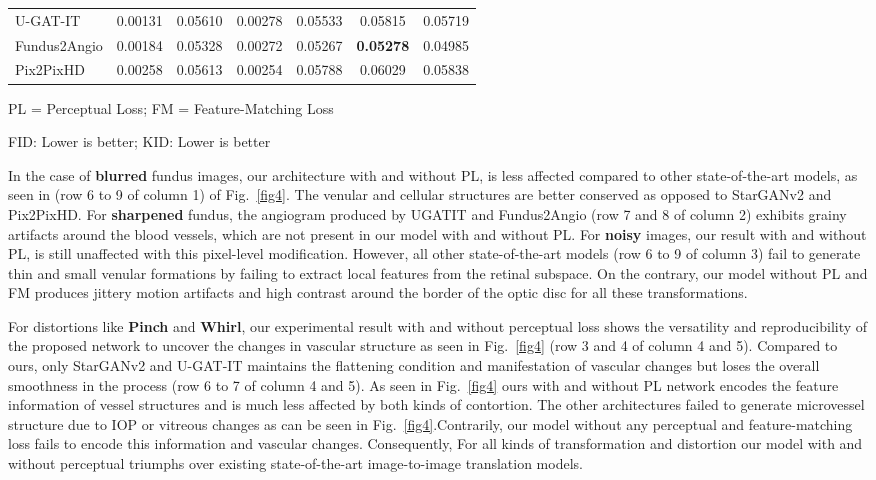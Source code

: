 \documentclass[a4paper,conference]{IEEEtran}
\begin{document}
\begin{table*}[ht]
\begin{adjustbox}{width=5.8in,totalheight=2.8in}
\begin{threeparttable}
\begin{tabular}{|l|c|c|c|c|c|c|}
    U-GAT-IT \cite{kim2019u} & 0.00131	& 0.05610 & 0.00278 & 0.05533 & 0.05815 & 0.05719\\
    Fundus2Angio \cite{kamran2020fundus2angio} & 0.00184 & 0.05328 & 0.00272 & 0.05267 & \textbf{0.05278} & 0.04985 \\ 
    Pix2PixHD \cite{wang2018high} & 0.00258 & 0.05613 & 0.00254 & 0.05788 & 0.06029 & 0.05838 \\ 
    \hline
    \end{tabular}
    \begin{tablenotes}
         \item[1] PL = Perceptual Loss; FM = Feature-Matching Loss
         \item[2] FID: Lower is better; KID: Lower is better
    \end{tablenotes}
\end{threeparttable}
\end{adjustbox}
\label{table1}
\end{table*}

In the case of \textbf{blurred} fundus images, our architecture with and without PL, is less affected compared to other state-of-the-art models, as seen in (row 6 to 9 of column 1) of Fig.~\ref{fig4}. The venular and cellular structures are better conserved as opposed to StarGANv2 and Pix2PixHD. For \textbf{sharpened} fundus, the angiogram produced by UGATIT and Fundus2Angio (row 7 and 8 of column 2) exhibits grainy artifacts around the blood vessels, which are not present in our model with and without PL. For \textbf{noisy} images, our result with and without PL, is still unaffected with this pixel-level modification. However, all other state-of-the-art models (row 6 to 9 of column 3) fail to generate thin and small venular formations by failing to extract local features from the retinal subspace. On the contrary, our model without PL and FM produces jittery motion artifacts and high contrast around the border of the optic disc for all these transformations.


For distortions like \textbf{Pinch} and \textbf{Whirl}, our experimental result with and without perceptual loss shows the versatility and reproducibility of the proposed network to uncover the changes in vascular structure as seen in Fig.~\ref{fig4} (row 3 and 4 of column 4 and 5). Compared to ours, only StarGANv2 and U-GAT-IT maintains the flattening condition and manifestation of vascular changes but loses the overall smoothness in the process (row 6 to 7 of column 4 and 5). As seen in Fig.~\ref{fig4} ours with and without PL network encodes the feature information of vessel structures and is much less affected by both kinds of contortion. The other architectures failed to generate microvessel structure due to IOP or vitreous changes as can be seen in Fig.~\ref{fig4}.Contrarily, our model without any perceptual and feature-matching loss fails to encode this information and vascular changes. Consequently, For all kinds of transformation and distortion our model with and without perceptual triumphs over existing state-of-the-art image-to-image translation models.
\end{document}
